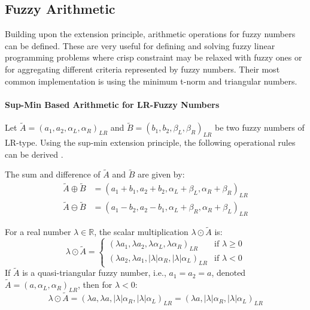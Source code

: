 \subsection{Fuzzy Arithmetic}
\label{sec:fuzzy_arithmetic}

Building upon the extension principle, arithmetic operations for fuzzy numbers can be defined. These are very useful for defining and solving fuzzy linear programming problems where crisp constraint may be relaxed with fuzzy ones or for aggregating different criteria represented by fuzzy numbers. Their most common implementation is using the minimum t-norm and triangular numbers.

\paragraph{Sup-Min Based Arithmetic for LR-Fuzzy Numbers}
Let $\tilde{A} = (a_1, a_2, \alpha_L, \alpha_R)_{LR}$ and $\tilde{B} = (b_1, b_2, \beta_L, \beta_R)_{LR}$ be two fuzzy numbers of LR-type. Using the sup-min extension principle, the following operational rules can be derived \cite[p.16]{FULLER2}.

\begin{proposition}
\label{prop:lr_add_sub}
The sum and difference of $\tilde{A}$ and $\tilde{B}$ are given by:
\begin{align}
\tilde{A} \oplus \tilde{B} &= (a_1+b_1, a_2+b_2, \alpha_L+\beta_L, \alpha_R+\beta_R)_{LR} \\
\tilde{A} \ominus \tilde{B} &= (a_1-b_2, a_2-b_1, \alpha_L+\beta_R, \alpha_R+\beta_L)_{LR}
\end{align}
\end{proposition}

\begin{proposition}
\label{prop:lr_scalar_mult}
For a real number $\lambda \in \mathbb{R}$, the scalar multiplication $\lambda \odot \tilde{A}$ is:
\begin{equation}
\lambda \odot \tilde{A} =
\begin{cases}
(\lambda a_1, \lambda a_2, \lambda\alpha_L, \lambda\alpha_R)_{LR} & \text{if } \lambda \ge 0 \\
(\lambda a_2, \lambda a_1, |\lambda|\alpha_R, |\lambda|\alpha_L)_{LR} & \text{if } \lambda < 0
\end{cases}
\end{equation}
If $\tilde{A}$ is a quasi-triangular fuzzy number, i.e., $a_1=a_2=a$, denoted $\tilde{A}=(a, \alpha_L, \alpha_R)_{LR}$, then for $\lambda < 0$:
\begin{equation}
\lambda \odot \tilde{A} = (\lambda a, \lambda a, |\lambda|\alpha_R, |\lambda|\alpha_L)_{LR} = (\lambda a, |\lambda|\alpha_R, |\lambda|\alpha_L)_{LR}
\end{equation}
\end{proposition}

